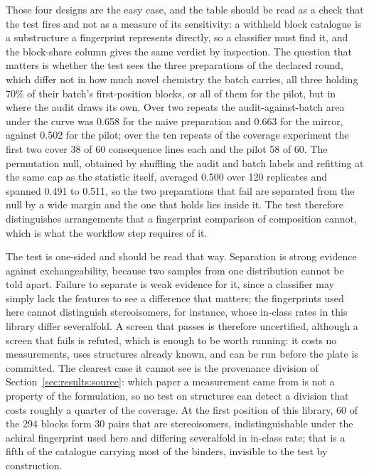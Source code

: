 \documentclass[twocolumn,10pt]{article}
\begin{document}
Those four designs are the easy case, and the table should be read as a check that the test fires and not as a measure of its sensitivity: a withheld block catalogue is a substructure a fingerprint represents directly, so a classifier must find it, and the block-share column gives the same verdict by inspection. The question that matters is whether the test sees the three preparations of the declared round, which differ not in how much novel chemistry the batch carries, all three holding 70\% of their batch's first-position blocks, or all of them for the pilot, but in where the audit draws its own. Over two repeats the audit-against-batch area under the curve was 0.658 for the naive preparation and 0.663 for the mirror, against 0.502 for the pilot; over the ten repeats of the coverage experiment the first two cover 38 of 60 consequence lines each and the pilot 58 of 60. The permutation null, obtained by shuffling the audit and batch labels and refitting at the same cap as the statistic itself, averaged 0.500 over 120 replicates and spanned 0.491 to 0.511, so the two preparations that fail are separated from the null by a wide margin and the one that holds lies inside it. The test therefore distinguishes arrangements that a fingerprint comparison of composition cannot, which is what the workflow step requires of it.

The test is one-sided and should be read that way. Separation is strong evidence against exchangeability, because two samples from one distribution cannot be told apart. Failure to separate is weak evidence for it, since a classifier may simply lack the features to see a difference that matters; the fingerprints used here cannot distinguish stereoisomers, for instance, whose in-class rates in this library differ severalfold. A screen that passes is therefore uncertified, although a screen that fails is refuted, which is enough to be worth running: it costs no measurements, uses structures already known, and can be run before the plate is committed. The clearest case it cannot see is the provenance division of Section~\ref{sec:results:source}: which paper a measurement came from is not a property of the formulation, so no test on structures can detect a division that costs roughly a quarter of the coverage. At the first position of this library, 60 of the 294 blocks form 30 pairs that are stereoisomers, indistinguishable under the achiral fingerprint used here and differing severalfold in in-class rate; that is a fifth of the catalogue carrying most of the binders, invisible to the test by construction.
\end{document}
